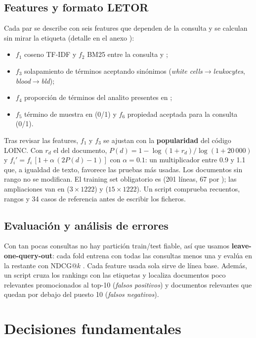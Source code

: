 \documentclass[11pt,a4paper]{article}
\begin{document}
\subsection{Features y formato LETOR}
Cada par se describe con seis features que dependen de la consulta y se calculan sin mirar la etiqueta
(detalle en el anexo ):
\begin{itemize}[nosep]
\item $f_1$ coseno TF-IDF y $f_2$ BM25 \cite{robertson2009} entre la consulta y ;
\item $f_3$ solapamiento de términos aceptando sinónimos (\emph{white cells}$\to$\emph{leukocytes}, \emph{blood}$\to$\emph{bld});
\item $f_4$ proporción de términos del analito presentes en ;
\item $f_5$ término de muestra en  (0/1) y $f_6$ propiedad aceptada para la consulta (0/1).
\end{itemize}
Tras revisar las features, $f_1$ y $f_3$ se ajustan con la \textbf{popularidad} del código LOINC. Con $r_d$ el
 del documento, $P(d)=1-\log(1+r_d)/\log(1+20\,000)$ y
$f_i'=f_i\,[1+\alpha\,(2P(d)-1)]$ con $\alpha=0.1$: un multiplicador entre 0.9 y 1.1 que, a igualdad de texto, favorece las
pruebas más usadas. Los documentos sin rango no se modifican.
El training set obligatorio es  (201 líneas, 67 por ); las ampliaciones van en
 ($3\times1222$) y  ($15\times1222$). Un script comprueba recuentos, rangos y
34 casos de referencia antes de escribir los ficheros.

\subsection{Evaluación y análisis de errores}
Con tan pocas consultas no hay partición train/test fiable, así que usamos \textbf{leave-one-query-out}: cada fold entrena con
todas las consultas menos una y evalúa en la restante con NDCG@$k$ \cite{jarvelin2002}. Cada feature usada sola sirve de línea base.
Además, un script cruza los rankings con las etiquetas y localiza documentos poco relevantes promocionados al top-10
(\emph{falsos positivos}) y documentos relevantes que quedan por debajo del puesto 10 (\emph{falsos negativos}).

\section{Decisiones fundamentales}
\end{document}
